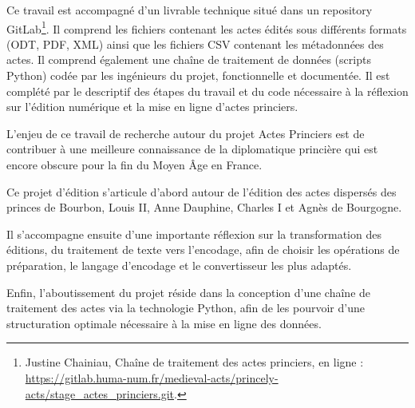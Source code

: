 \par Ce travail est accompagné d'un livrable technique situé dans un repository GitLab\footnote{Justine Chainiau, Chaîne de traitement des actes princiers, en ligne : \url{https://gitlab.huma-num.fr/medieval-acts/princely-acts/stage_actes_princiers.git}.}. Il comprend les fichiers contenant les actes édités sous différents formats (ODT, PDF, XML) ainsi que les fichiers CSV contenant les métadonnées des actes. Il comprend également une chaîne de traitement de données (scripts Python) codée par les ingénieurs du projet, fonctionnelle et documentée. Il est complété par le descriptif des étapes du travail et du code nécessaire à la réflexion sur l’édition numérique et la mise en ligne d'actes princiers. 
\newline 

\par L'enjeu de ce travail de recherche autour du projet \og Actes Princiers \fg \space est de contribuer à une meilleure connaissance de la diplomatique princière qui est encore obscure pour la fin du Moyen Âge en France. 
\par Ce projet d'édition s'articule d'abord autour de l'édition des actes dispersés des princes de Bourbon, Louis II, Anne Dauphine, Charles I et Agnès de Bourgogne. 
\par Il s'accompagne ensuite d'une importante réflexion sur la transformation des éditions, du traitement de texte vers l'encodage, afin de choisir les opérations de préparation, le langage d'encodage et le convertisseur les plus adaptés. 
\par Enfin, l'aboutissement du projet réside dans la conception d'une chaîne de traitement des actes via la technologie Python, afin de les pourvoir d'une structuration optimale nécessaire à la mise en ligne des données. 

\newpage
\thispagestyle{empty}
\mbox{}
\newpage